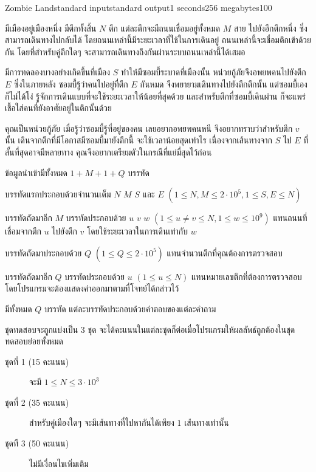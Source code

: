 \documentclass[11pt,a4paper]{article}
\begin{document}
\begin{problem}{Zombie Land}{standard input}{standard output}{1 seconds}{256 megabytes}{100}

มีเมืองอยู่เมืองหนึ่ง มีตึกทั้งสิ้น $N$ ตึก แต่ละตึกจะมีถนนเชื่อมอยู่ทั้งหมด $M$ สาย ไปยังอีกตึกหนึ่ง ซึ่งสามารถเดินทางไปกลับได้ โดยถนนเหล่านี้มีระยะเวลาที่ใช้ในการเดินอยู่ ถนนเหล่านี้จะเชื่อมตึกเข้าด้วยกัน โดยที่สำหรับคู่ตึกใดๆ จะสามารถเดินทางถึงกันผ่านระบบถนนเหล่านี้ได้เสมอ

มีการทดลองบางอย่างเกิดขึ้นที่เมือง $S$ ทำให้มีซอมบี้ระบาดที่เมืองนั้น หน่วยกู้ภัยจึงอพยพคนไปยังตึก $E$ ซึ่งในภายหลัง ซอมบี้รู้ว่าคนไปอยู่ที่ตึก $E$ กันหมด จึงพยายามเดินทางไปยังตึกตึกนั้น แต่ซอมบี้เองก็ไม่ได้โง่ รู้จักการเดินแบบที่จะใช้ระยะเวลาให้น้อยที่สุดด้วย และสำหรับตึกที่ซอมบี้เดินผ่าน ก็จะแพร่เชื้อใส่คนที่ยังอาศัยอยู่ในตึกนั้นด้วย

คุณเป็นหน่วยกู้ภัย เมื่อรู้ว่าซอมบี้รู้ที่อยู่ของคน เลยอยากอพยพคนหนี จึงอยากทราบว่าสำหรับตึก $v$ นั้น เดินจากตึกที่มีโอกาสมีซอมบี้มายังตึกนี้ จะใช้เวลาน้อยสุดเท่าไร เนื่องจากเส้นทางจาก $S$ ไป $E$ ที่สั้นที่สุดอาจมีหลายทาง คุณจึงอยากเตรียมตัวในกรณีที่แย่มี่สุดไว้ก่อน

\InputFile
ข้อมูลนำเข้ามีทั้งหมด $1 + M + 1 + Q$ บรรทัด

บรรทัดแรกประกอบด้วยจำนวนเต็ม $N$ $M$ $S$ และ $E$ $(1 \leq N, M \leq 2 \cdot 10^5, 1 \leq S, E \leq N)$ 

บรรทัดถัดมาอีก $M$ บรรทัดประกอบด้วย $u$ $v$ $w$ $(1 \leq u \neq v \leq N, 1 \leq w \leq 10^9)$ แทนถนนที่เชื่อมจากตึก $u$ ไปยังตึก $v$ โดยใช้ระยะเวลาในการเดินเท่ากับ $w$

บรรทัดถัดมาประกอบด้วย $Q$ $(1 \leq Q \leq 2 \cdot 10^5)$ แทนจำนวนตึกที่คุณต้องการตรวจสอบ

บรรทัดถัดมาอีก $Q$ บรรทัดประกอบด้วย $u$ $(1 \leq u \leq N)$ แทนหมายเลขตึกที่ต้องการตรวจสอบ โดยโปรแกรมจะต้องแสดงค่าออกมาตามที่โจทย์ได้กล่าวไว้

\OutputFile
มีทั้งหมด $Q$ บรรทัด แต่ละบรรทัดประกอบด้วยคำตอบของแต่ละคำถาม

\Scoring
ชุดทดสอบจะถูกแบ่งเป็น 3 ชุด จะได้คะแนนในแต่ละชุดก็ต่อเมื่อโปรแกรมให้ผลลัพธ์ถูกต้องในชุดทดสอบย่อยทั้งหมด

\begin{description}

\item[ชุดที่ 1 (15 คะแนน)] จะมี $ 1 \leq N \leq 3 \cdot 10^3 $

\item[ชุดที่ 2 (35 คะแนน)] สำหรับคู่เมืองใดๆ จะมีเส้นทางที่ไปหากันได้เพียง $1$ เส้นทางเท่านั้น

\item[ชุดที 3 (50 คะแนน)] ไม่มีเงื่อนไขเพิ่มเติม

\end{description}

\Examples

\begin{example}
%
\end{example}

\end{problem}
\end{document}
